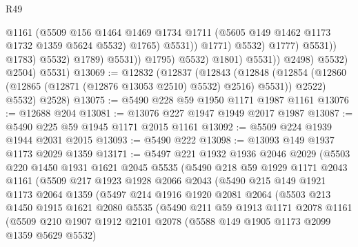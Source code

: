 \begin{lexlean}{R49}
\begin{coremodule}
                                              @1161
                                              (@5509
                                                @156
                                                @1464
                                                @1469
                                                @1734
                                                @1711
                                                (@5605 @149 @1462 @1173 @1732 @1359 @5624 @5532)
                                                @1765)
                                              @5531))
                                          @1771)
                                        @5532)
                                      @1777)
                                    @5531))
                                @1783)
                              @5532)
                            @1789)
                          @5531))
                      @1795)
                    @5532)
                  @1801)
                @5531))
            @2498)
          @5532)
        @2504)
      @5531)
@13069 := @12832
    (@12837
      (@12843
        (@12848 (@12854 (@12860 (@12865 (@12871 (@12876 @13053 @2510) @5532) @2516) @5531)) @2522)
        @5532)
      @2528)
@13075 := @5490 @228 @59 @1950 @1171 @1987 @1161
@13076 := @12688 @204
@13081 := @13076 @227 @1947 @1949 @2017 @1987
@13087 := @5490 @225 @59 @1945 @1171 @2015 @1161
@13092 := @5509 @224 @1939 @1944 @2031 @2015
@13093 := @5490 @222
@13098 := @13093 @149 @1937 @1173 @2029 @1359
@13171 := @5497
    @221
    @1932
    @1936
    @2046
    @2029
    (@5503
      @220
      @1450
      @1931
      @1621
      @2045
      @5535
      (@5490
        @218
        @59
        @1929
        @1171
        @2043
        @1161
        (@5509
          @217
          @1923
          @1928
          @2066
          @2043
          (@5490
            @215
            @149
            @1921
            @1173
            @2064
            @1359
            (@5497
              @214
              @1916
              @1920
              @2081
              @2064
              (@5503
                @213
                @1450
                @1915
                @1621
                @2080
                @5535
                (@5490
                  @211
                  @59
                  @1913
                  @1171
                  @2078
                  @1161
                  (@5509
                    @210
                    @1907
                    @1912
                    @2101
                    @2078
                    (@5588 @149 @1905 @1173 @2099 @1359 @5629 @5532)

\end{coremodule}
\end{lexlean}
